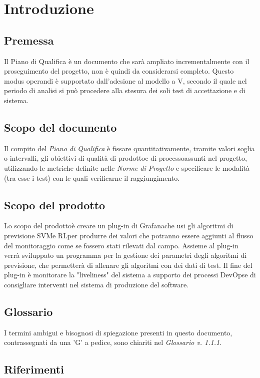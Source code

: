 \section{Introduzione}
	\subsection{Premessa}
	Il Piano di Qualifica è un documento che sarà ampliato incrementalmente con il proseguimento del progetto\glo, non è quindi da considerarsi completo. Questo modus operandi è supportato dall'adesione al modello a V\glo, secondo il quale nel periodo di analisi si può procedere alla stesura dei soli test di accettazione e di sistema.
	
	\subsection{Scopo del documento}
	Il compito del \textit{Piano di Qualifica} è fissare quantitativamente, tramite valori soglia o intervalli, gli obiettivi di qualità di prodotto\glosp e di processo\glosp assunti nel progetto\glo, utilizzando le metriche definite nelle \textit{Norme di Progetto} e specificare le modalità (tra esse i test) con le quali verificarne il raggiungimento.

	\subsection{Scopo del prodotto}
	Lo scopo del prodotto\glosp è creare un plug-in di Grafana\glosp che usi gli algoritmi di previsione SVM\glosp e RL\glosp per produrre dei valori che potranno essere aggiunti al flusso del monitoraggio come se fossero stati rilevati dal campo. Assieme al plug-in verrà sviluppato un programma per la gestione dei parametri degli algoritmi di previsione, che permetterà di allenare gli algoritmi con dei dati di test. Il fine del plug-in è monitorare la "liveliness" del sistema a supporto dei processi DevOps\glosp e di consigliare interventi nel sistema di produzione del software.
	
	\subsection{Glossario}
	I termini ambigui e bisognosi di spiegazione presenti in questo documento, contrassegnati da una 'G' a pedice, sono chiariti nel \textit{Glossario v. 1.1.1}.
	
	\subsection{Riferimenti}
